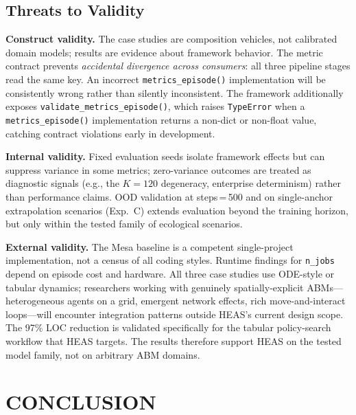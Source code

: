 \documentclass{wscpaperproc}
\begin{document}
\subsection{Threats to Validity}

\textbf{Construct validity.} The case studies are composition vehicles, not
calibrated domain models; results are evidence about framework behavior. The
metric contract prevents \emph{accidental divergence across consumers}: all
three pipeline stages read the same key. An incorrect \texttt{metrics\_episode()}
implementation will be consistently wrong rather than silently inconsistent. The
framework additionally exposes \texttt{validate\_metrics\_episode()}, which raises
\texttt{TypeError} when a \texttt{metrics\_episode()} implementation returns a
non-dict or non-float value, catching contract violations early in development.

\textbf{Internal validity.} Fixed evaluation seeds isolate framework effects
but can suppress variance in some metrics; zero-variance outcomes are treated as
diagnostic signals (e.g., the $K\!=\!120$ degeneracy, enterprise determinism)
rather than performance claims. OOD validation at steps\,=\,500 and on
single-anchor extrapolation scenarios (Exp.~C) extends evaluation beyond the
training horizon, but only within the tested family of ecological scenarios.

\textbf{External validity.} The Mesa baseline is a competent single-project
implementation, not a census of all coding styles. Runtime findings for
\texttt{n\_jobs} depend on episode cost and hardware. All three case studies
use ODE-style or tabular dynamics; researchers working with genuinely
spatially-explicit ABMs---heterogeneous agents on a grid, emergent network
effects, rich move-and-interact loops---will encounter integration patterns
outside HEAS's current design scope. The 97\% LOC reduction is validated
specifically for the tabular policy-search workflow that HEAS targets. The
results therefore support HEAS on the tested model family, not on arbitrary ABM
domains.

\section{CONCLUSION}
\end{document}
